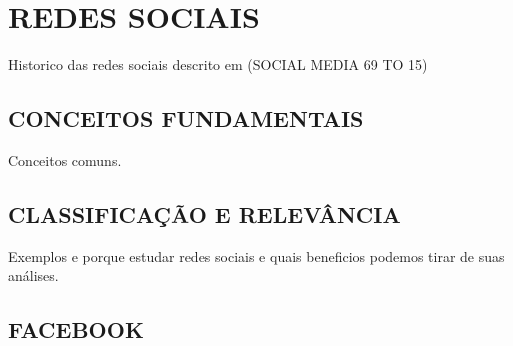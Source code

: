 
%

\chapter{REDES SOCIAIS}
\label{chap:redesSociais}
Historico das redes sociais descrito em (SOCIAL MEDIA 69 TO 15)

\section{CONCEITOS FUNDAMENTAIS}
\label{sec:conceitosRedesSociais}
Conceitos comuns.

\section{CLASSIFICAÇÃO E RELEVÂNCIA}
\label{sec:classRedesSociais}
Exemplos e porque estudar redes sociais e quais beneficios podemos tirar de suas análises.

\section{FACEBOOK}
\label{sec:facebookRedesSociais}